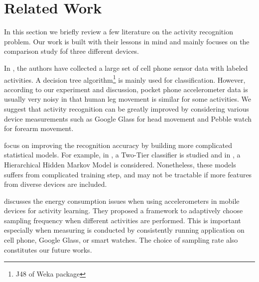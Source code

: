 
\section{Related Work}
\label{sec:related-work}

In this section we briefly review a few literature on the activity recognition problem. Our work is built with their lessons in mind and mainly focuses on the comparison study fof three different devices. 

In \cite{kwapisz2011activity}, the authors have collected a large set of cell phone sensor data with labeled activities. A decision tree algorithm\footnote{J48 of Weka package} is mainly used for classification. However, according to our experiment and discussion, pocket phone accelerometer data is usually very noisy in that human leg movement is similar for some activities. We suggest that activity recognition can be greatly improved by considering various device measurements such as Google Glass for head movement and Pebble watch for forearm movement.

\cite{lee2011activity, srinivasan2012accurate} focus on improving the recognition accuracy by building more complicated statistical models. For example, in \cite{srinivasan2012accurate}, a Two-Tier classifier is studied and in \cite{lee2011activity}, a Hierarchical Hidden Markov Model is considered. Nonetheless, these models suffers from complicated training step, and may not be tractable if more features from diverse devices are included. 

\cite{yan2012energy} discusses the energy consumption issues when using accelerometers in mobile devices for activity learning. They proposed a framework to adaptively choose sampling frequency when different activities are performed. This is important especially when measuring is conducted by consistently running application on cell phone, Google Glass, or smart watches. The choice of sampling rate also constitutes our future works. 

 
